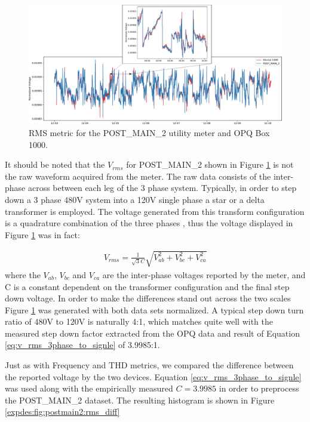 \begin{figure}[ht!]
    \centering
    \includegraphics[width=1\linewidth]{img/napali_eval/gt/gt_rms.pdf}
    \caption{RMS metric for the POST\_MAIN\_2 utility meter and OPQ Box 1000.}
    \label{expdes:fig:postmain2:rms}
\end{figure}

It should be noted that the $V_{rms}$ for POST\_MAIN\_2 shown in Figure \ref{expdes:fig:postmain2:rms} is not the raw waveform acquired from the meter.
The raw data consists of the inter-phase across between each leg of the 3 phase system.
Typically, in order to step down a 3 phase 480V system into a 120V single phase a star or a delta transformer is employed.
The voltage generated from this transform configuration is a quadrature combination of the three phases \cite{Horowitz:2015:AE:2960712}, thus the voltage displayed in Figure \ref{expdes:fig:postmain2:rms} was in fact:

\begin{equation}\label{eq:v_rms_3phase_to_signle}
\begin{aligned}
    V_{rms} = \frac{1}{\sqrt{3}C}\sqrt{V_{ab}^2 + V_{bc}^2 +V_{ca}^2}
\end{aligned}
\end{equation}
where the $V_{ab}$, $V_{bc}$ and $V_{ca}$ are the inter-phase voltages reported by the meter, and C is a constant dependent on the transformer configuration and the final step down voltage.
In order to make the differences stand out across the two scales Figure \ref{expdes:fig:postmain2:rms} was generated with both data sets normalized.
A typical step down turn ratio of 480V to 120V is naturally 4:1, which matches quite well with the measured step down factor extracted from the OPQ data and result of Equation \ref{eq:v_rms_3phase_to_signle} of 3.9985:1.

Just as with Frequency and THD metrics, we compared the difference between the reported voltage by the two devices.
Equation \ref{eq:v_rms_3phase_to_signle} was used along with the empirically measured $C = 3.9985$ in order to preprocess the POST\_MAIN\_2 dataset.
The resulting histogram is shown in Figure \ref{expdes:fig:postmain2:rms_diff}


